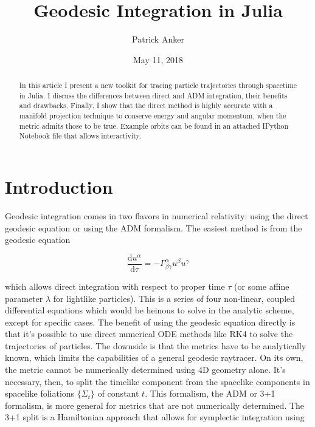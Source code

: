 \documentclass[%
preprint,
onecolumn,
amsmath,amssymb,
aps,
]{revtex4-1}
\newcommand{\D}{\mathrm{d}}
\numberwithin{equation}{section}
\begin{document}

	\title{Geodesic Integration in Julia}

	\author{Patrick Anker}

	\date{May 11, 2018}

	\begin{abstract}
        In this article I present a new toolkit for tracing particle trajectories through spacetime in Julia. I discuss the differences between direct and ADM integration, their benefits and drawbacks. Finally, I show that the direct method is highly accurate with a manifold projection technique to conserve energy and angular momentum, when the metric admits those to be true. Example orbits can be found in an attached IPython Notebook file that allows interactivity.
	\end{abstract}

	\maketitle

	\tableofcontents

	\section{\label{sec:intro}Introduction}

    Geodesic integration comes in two flavors in numerical relativity: using the direct geodesic equation or using the ADM formalism. The easiest method is from the geodesic equation

    \begin{equation}
        \frac{\D u^\alpha}{\D\tau} = -\Gamma^{\alpha}_{\beta\gamma}u^{\beta}u^{\gamma}
        \label{eq:geodesic-eqn}
    \end{equation}

    which allows direct integration with respect to proper time $\tau$ (or some affine parameter $\lambda$ for lightlike particles). This is a series of four non-linear, coupled differential equations which would be heinous to solve in the analytic scheme, except for specific cases. The benefit of using the geodesic equation directly is that it's possible to use direct numerical ODE methods like RK4 to solve the trajectories of particles. The downside is that the metrics have to be analytically known, which limits the capabilities of a general geodesic raytracer. On its own, the metric cannot be numerically determined using 4D geometry alone. It's necessary, then, to split the timelike component from the spacelike components in spacelike foliations $\{\Sigma_t\}$ of constant $t$. This formalism, the ADM or 3+1 formalism, is more general for metrics that are not numerically determined. The 3+1 split is a Hamiltonian approach that allows for symplectic integration using
\end{document}
